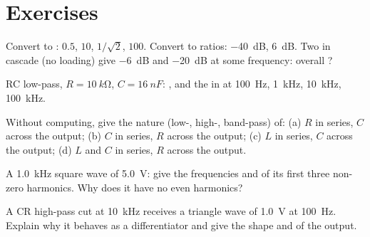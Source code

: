 \section{Exercises}

\begin{exercise}[$\star$]\label{exo:b1:filters-transfer-functions:1}
Convert to :  $0.5$, $10$, $1/\sqrt2$, $100$. Convert to
ratios: \qty{-40}{dB}, \qty{+6}{dB}. Two  in cascade (no loading)
give \qty{-6}{dB} and \qty{-20}{dB} at some frequency: overall ?
\end{exercise}

\begin{exercise}[$\star$]\label{exo:b1:filters-transfer-functions:2}
RC low-pass, $R = \qty{10}{k\ohm}$, $C = \qty{16}{nF}$: ,
and the  in  at \qty{100}{Hz}, \qty{1}{kHz}, \qty{10}{kHz},
\qty{100}{kHz}.
\end{exercise}

\begin{exercise}[$\star$]\label{exo:b1:filters-transfer-functions:3}
Without computing, give the nature (low-, high-, band-pass) of: (a)
$R$ in series, $C$ across the output; (b) $C$ in series, $R$ across the
output; (c) $L$ in series, $C$ across the output; (d) $L$ and $C$ in
series, $R$ across the output.
\end{exercise}

\begin{exercise}[$\star$]\label{exo:b1:filters-transfer-functions:4}
A \qty{1.0}{kHz} square wave of  \qty{5.0}{V}: give the
frequencies and  of its first three non-zero harmonics. Why
does it have no even harmonics?
\end{exercise}

\begin{exercise}[$\star\star$]\label{exo:b1:filters-transfer-functions:5}
A CR high-pass cut at \qty{10}{kHz} receives a triangle wave of
 \qty{1.0}{V} at \qty{100}{Hz}. Explain why it behaves as a
differentiator and give the shape and  of the output.
\end{exercise}

